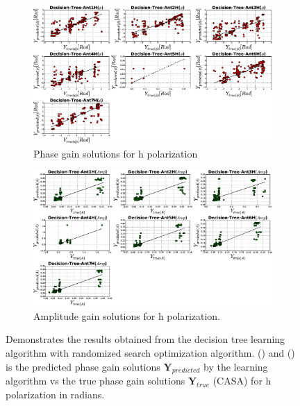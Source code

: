 \begin{figure}[H]
   \centering
    \begin{subfigure}[t]{0.52\textheight}
        
        \includegraphics[width=\textwidth]{images/Decision-TreeHphase.eps} 
        \caption{Phase gain solutions for h polarization}
         \label{A}
    \end{subfigure}
    
      \begin{subfigure}[t]{0.52\textheight}
       
        \includegraphics[width=\textwidth]{images/Decision-TreeHamp.eps} 
        \caption{Amplitude gain solutions for h polarization.}
         \label{B}
    \end{subfigure}
    \caption{Demonstrates the results obtained from the decision tree learning algorithm with randomized search optimization algorithm. () and () is the predicted phase gain solutions $\textbf{Y}_{predicted}$ by the learning algorithm vs the true phase gain solutions $\textbf{Y}_{true}$ (CASA) for h polarization in radians. }
    \end{figure}
  
